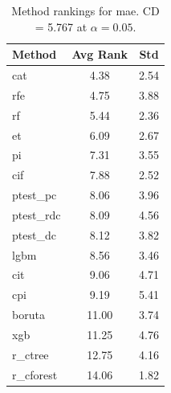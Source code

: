 \begin{table}[h]
\centering
\caption{Method rankings for mae. CD = 5.767 at $\alpha=0.05$.}
\label{tab:ranks_mae}
\begin{tabular}{lcc}
\toprule
Method & Avg Rank & Std \\
\midrule
cat & 4.38 & 2.54 \\
rfe & 4.75 & 3.88 \\
rf & 5.44 & 2.36 \\
et & 6.09 & 2.67 \\
pi & 7.31 & 3.55 \\
cif & 7.88 & 2.52 \\
ptest_pc & 8.06 & 3.96 \\
ptest_rdc & 8.09 & 4.56 \\
ptest_dc & 8.12 & 3.82 \\
lgbm & 8.56 & 3.46 \\
cit & 9.06 & 4.71 \\
cpi & 9.19 & 5.41 \\
boruta & 11.00 & 3.74 \\
xgb & 11.25 & 4.76 \\
r_ctree & 12.75 & 4.16 \\
r_cforest & 14.06 & 1.82 \\
\bottomrule
\end{tabular}
\end{table}